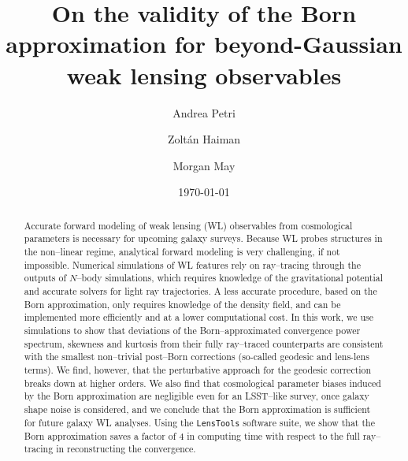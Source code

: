 \documentclass[reprint,aps,prd,superscriptaddress,showkeys,showpacs]{revtex4-1}
\newcommand{\ttt}[1]{\texttt{#1}}
\begin{document}
\title{On the validity of the Born approximation for beyond-Gaussian weak lensing observables}

\author{Andrea Petri}

\author{Zolt\'an Haiman}

\author{Morgan May}

\date{\today}

\label{firstpage}

\begin{abstract}
Accurate forward modeling of weak lensing (WL) observables from cosmological parameters is necessary for upcoming galaxy surveys. Because WL probes structures in the non--linear regime, analytical forward modeling is very challenging, if not impossible. Numerical simulations of WL features rely on ray--tracing through the outputs of $N$--body simulations, which requires knowledge of the gravitational potential and accurate solvers for light ray trajectories. A less accurate procedure, based on the Born approximation, only requires knowledge of the density field, and can be implemented more efficiently and at a lower computational cost. In this work, we use simulations to show that deviations of the Born--approximated convergence power spectrum, skewness and kurtosis from their fully ray--traced counterparts are consistent with the smallest non--trivial post--Born corrections (so-called geodesic and lens-lens terms).  We find, however, that the perturbative approach for the geodesic correction breaks down at higher orders. We also find that cosmological parameter biases induced by the Born approximation are negligible even for an LSST--like survey, once galaxy shape noise is considered, and we conclude that the Born approximation is sufficient for future galaxy WL analyses. Using the \ttt{LensTools} software suite, we show that the Born approximation saves a factor of 4 in computing time with respect to the full ray--tracing in reconstructing the convergence.       
\end{abstract}


\end{document}
